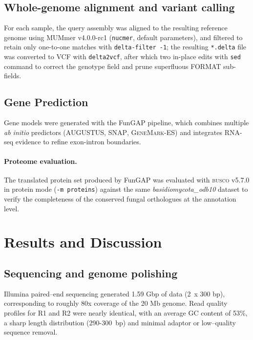 \documentclass[Journal,letterpaper]{ascelike-new}
\begin{document}
\subsection*{Whole-genome alignment and variant calling}

For each sample, the query assembly was aligned to the resulting
reference genome using MUMmer v4.0.0-rc1 (\verb|nucmer|, default
parameters), and filtered to retain only one-to-one matches with
\verb|delta-filter -1|; the resulting \texttt{*.delta} file was
converted to VCF with \verb|delta2vcf|, after which two in-place
edits with \verb|sed| command to correct the genotype field and prune
superfluous FORMAT sub-fields.

\subsection*{Gene Prediction}

Gene models were generated with the FunGAP pipeline, which combines
multiple \textit{ab initio} predictors (\textsc{AUGUSTUS},
\textsc{SNAP}, \textsc{GeneMark-ES}) and integrates RNA-seq evidence
to refine exon-intron boundaries.

\paragraph{Proteome evaluation.} The translated protein set produced
by FunGAP was evaluated with \textsc{busco} v5.7.0 in protein mode
(\texttt{-m proteins}) against the same \textit{basidiomycota\_odb10}
dataset to verify the completeness of the conserved fungal
orthologues at the annotation level.

\section*{Results and Discussion}

\subsection*{Sequencing and genome polishing}

Illumina paired--end sequencing generated 1.59 Gbp of data (2~x 300
bp), corresponding to roughly 80x coverage of the 20 Mb genome. Read
quality profiles for R1 and R2 were nearly identical, with an average
GC content of 53\%, a sharp length distribution (290-300~bp) and
minimal adaptor or low--quality sequence removal.
\end{document}
